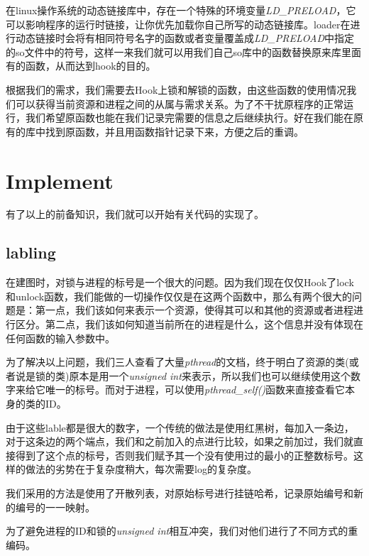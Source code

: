 \documentclass[titlepage]{article}
\begin{document}
\indent 在linux操作系统的动态链接库中，存在一个特殊的环境变量\emph{LD\_PRELOAD}，它可以影响程序的运行时链接，让你优先加载你自己所写的动态链接库。loader在进行动态链接时会将有相同符号名字的函数或者变量覆盖成\emph{LD\_PRELOAD}中指定的so文件中的符号，这样一来我们就可以用我们自己so库中的函数替换原来库里面有的函数，从而达到hook的目的。

\indent 根据我们的需求，我们需要去Hook上锁和解锁的函数，由这些函数的使用情况我们可以获得当前资源和进程之间的从属与需求关系。为了不干扰原程序的正常运行，我们希望原函数也能在我们记录完需要的信息之后继续执行。好在我们能在原有的库中找到原函数，并且用函数指针记录下来，方便之后的重调。

\section{Implement}
\indent 有了以上的前备知识，我们就可以开始有关代码的实现了。

\subsection{labling}
\indent 在建图时，对锁与进程的标号是一个很大的问题。因为我们现在仅仅Hook了lock和unlock函数，我们能做的一切操作仅仅是在这两个函数中，那么有两个很大的问题是：第一点，我们该如何来表示一个资源，使得其可以和其他的资源或者进程进行区分。第二点，我们该如何知道当前所在的进程是什么，这个信息并没有体现在任何函数的输入参数中。

\indent 为了解决以上问题，我们三人查看了大量\emph{pthread}的文档，终于明白了资源的类(或者说是锁的类)原本是用一个\emph{unsigned int}来表示，所以我们也可以继续使用这个数字来给它唯一的标号。而对于进程，可以使用\emph{pthread\_self()}函数来直接查看它本身的类的ID。

\indent 由于这些lable都是很大的数字，一个传统的做法是使用红黑树，每加入一条边，对于这条边的两个端点，我们和之前加入的点进行比较，如果之前加过，我们就直接得到了这个点的标号，否则我们赋予其一个没有使用过的最小的正整数标号。这样的做法的劣势在于复杂度稍大，每次需要log的复杂度。

\indent 我们采用的方法是使用了开散列表，对原始标号进行挂链哈希，记录原始编号和新的编号的一一映射。

\indent 为了避免进程的ID和锁的\emph{unsigned int}相互冲突，我们对他们进行了不同方式的重编码。
\end{document}
